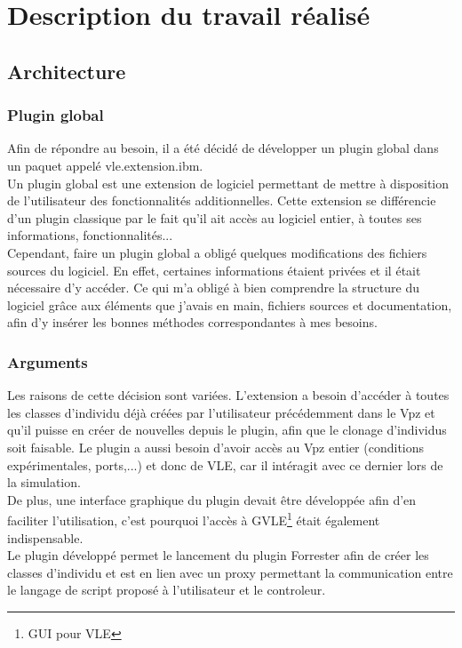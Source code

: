 \chapter{Description du travail réalisé}
\setlength{\parskip}{2.5ex plus .4ex minus .4ex}

\section{Architecture}
\subsection{Plugin global}
Afin de répondre au besoin, il a été décidé de développer un plugin global dans un paquet appelé vle.extension.ibm.\\
Un plugin global est une extension de logiciel permettant de mettre à disposition de l'utilisateur des fonctionnalités additionnelles. Cette extension se différencie d'un plugin classique par le fait qu'il ait accès au logiciel entier, à toutes ses informations, fonctionnalités...\\
Cependant, faire un plugin global a obligé quelques modifications des fichiers sources du logiciel. En effet, certaines informations étaient privées et il était nécessaire d'y accéder. Ce qui m'a obligé à bien comprendre la structure du logiciel grâce aux éléments que j'avais en main, fichiers sources et documentation, afin d'y insérer les bonnes méthodes correspondantes à mes besoins.

\subsection{Arguments}
Les raisons de cette décision sont variées. L'extension a besoin d'accéder à toutes les classes d'individu déjà créées par l'utilisateur précédemment dans le Vpz et qu'il puisse en créer de nouvelles depuis le plugin, afin que le clonage d'individus soit faisable. Le plugin a aussi besoin d'avoir accès au Vpz entier (conditions expérimentales, ports,...) et donc de VLE, car il intéragit avec ce dernier lors de la simulation.\\
De plus, une interface graphique du plugin devait être développée afin d'en faciliter l'utilisation, c'est pourquoi l'accès à GVLE\footnote{GUI pour VLE} était également indispensable.\\

Le plugin développé permet le lancement du plugin Forrester afin de créer les classes d'individu et est en lien avec un proxy permettant la communication entre le langage de script proposé à l'utilisateur et le controleur.\\

